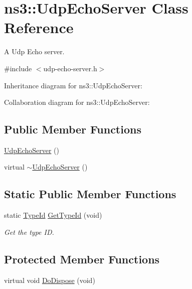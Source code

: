 \hypertarget{classns3_1_1UdpEchoServer}{}\section{ns3\+:\+:Udp\+Echo\+Server Class Reference}
\label{classns3_1_1UdpEchoServer}


A Udp Echo server.  




{\ttfamily \#include $<$udp-\/echo-\/server.\+h$>$}



Inheritance diagram for ns3\+:\+:Udp\+Echo\+Server\+:


Collaboration diagram for ns3\+:\+:Udp\+Echo\+Server\+:
\subsection*{Public Member Functions}
\begin{DoxyCompactItemize}
\item 
\hyperlink{classns3_1_1UdpEchoServer_ac7a64e2870cb9ca49dd58c1d8a902067}{Udp\+Echo\+Server} ()
\item 
virtual \hyperlink{classns3_1_1UdpEchoServer_a94c4dfefe15b1c4a1d7ccb0ad16f0c30}{$\sim$\+Udp\+Echo\+Server} ()
\end{DoxyCompactItemize}
\subsection*{Static Public Member Functions}
\begin{DoxyCompactItemize}
\item 
static \hyperlink{classns3_1_1TypeId}{Type\+Id} \hyperlink{classns3_1_1UdpEchoServer_a2a7915bfe902587df682c6461797e0fd}{Get\+Type\+Id} (void)
\begin{DoxyCompactList}\small\item\em Get the type ID. \end{DoxyCompactList}\end{DoxyCompactItemize}
\subsection*{Protected Member Functions}
\begin{DoxyCompactItemize}
\item 
virtual void \hyperlink{classns3_1_1UdpEchoServer_a4991a903cb822d78729c73e044705bc9}{Do\+Dispose} (void)
\end{DoxyCompactItemize}
